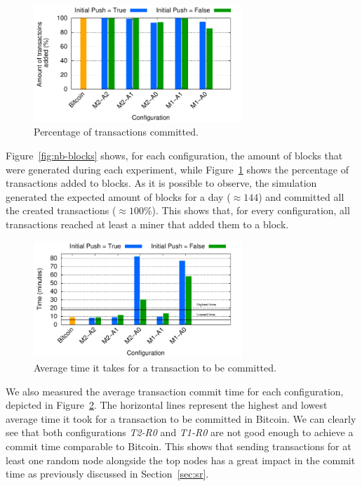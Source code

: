 \begin{figure}
\centering
\includegraphics[width=0.7\textwidth]{plots/tx-added.pdf}
\caption{Percentage of transactions committed.}
\label{fig:tx-added}
\end{figure}

Figure~\ref{fig:nb-blocks} shows, for each configuration, the amount of blocks that were generated during each experiment, while Figure~\ref{fig:tx-added} shows the percentage of transactions added to blocks. As it is possible to observe, the simulation generated the expected amount of blocks for a day ($\approx 144$) and committed all the created transactions ($\approx 100\%$). This shows that, for every configuration, all transactions reached at least a miner that added them to a block.

\begin{figure}
\centering
\includegraphics[width=0.7\textwidth]{plots/commit-time.pdf}
\caption{Average time it takes for a transaction to be committed.}
\label{fig:commit-time}
\end{figure}

We also measured the average transaction commit time for each configuration, depicted in Figure~\ref{fig:commit-time}.
The horizontal lines represent the highest and lowest average time it took for a transaction to be committed in Bitcoin. We can clearly see that both configurations \textsl{T2-R0} and \textsl{T1-R0} are not good enough to achieve a commit time comparable to Bitcoin.
This shows that sending transactions for at least one random node alongside the top nodes has a great impact in the commit time as previously discussed in Section~\ref{sec:sr}.

